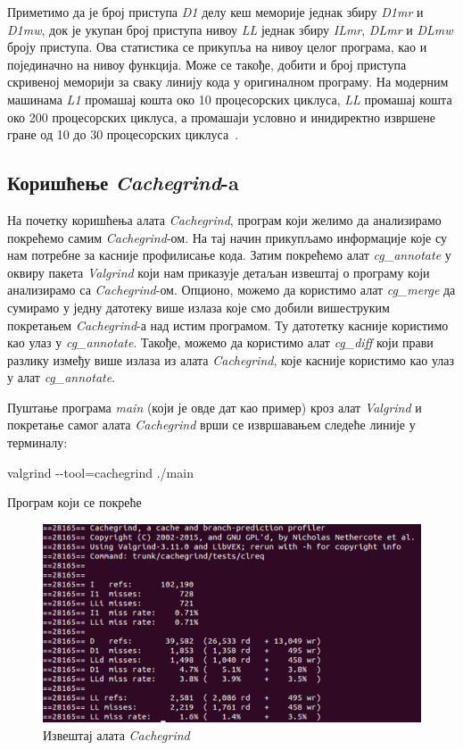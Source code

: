 \documentclass[12pt,oneside]{memoir}
\begin{document}
\indent Приметимо да је број приступа \textit{D1} делу кеш меморије једнак збиру \textit{D1mr} и \textit{D1mw}, док је укупан број приступа нивоу \textit{LL} једнак збиру  \textit{ILmr}, \textit{DLmr} и \textit{DLmw} броју приступа. Ова статистика се прикупља на нивоу целог програма, као и појединачно на нивоу функција. Може се такође, добити и број приступа скривеној меморији за сваку линију кода у оригиналном програму. На модерним машинама \textit{L1} промашај кошта око 10 процесорских циклуса, \textit{LL} промашај кошта око 200 процесорских циклуса, а промашаји условно и инидиректно извршене гране од 10 до 30 процесорских циклуса~\cite{cachegrindRef}.

\subsection{Коришћење \textit{Cachegrind}-a}

\indent На почетку коришћења алата \textit{Cachegrind}, програм који желимо да анализирамо покрећемо самим \textit{Cachegrind}-ом. На тај начин прикупљамо информације које су нам потребне за касније профилисање кода. Затим покрећемо алат \textit{cg\_annotate} у оквиру пакета \textit{Valgrind} који нам приказује детаљан извештај о програму који анализирамо са \textit{Cachegrind}-ом. Опционо, можемо да користимо алат \textit{cg\_merge} да сумирамо у једну датотеку више излаза које смо добили вишеструким покретањем \textit{Cachegrind}-а над истим програмом. Ту датотетку касније користимо као улаз у \textit{cg\_annotate}. Такође, можемо да користимо алат \textit{cg\_diff} који прави разлику између више излаза из алата \textit{Cachegrind}, које касније користимо као улаз у алат \textit{cg\_annotate}.

\indent Пуштање програма \textit{main} (који је овде дат	 као пример) кроз алат \textit{Valgrind} и покретање самог алата \textit{Cachegrind} врши се извршавањем следеће линије у терминалу:

\begin{center}
\large
 valgrind -\--tool=cachegrind ./main
\end{center}

Програм који се покреће

\begin{figure}[h!]
\begin{center}
\includegraphics[scale=0.75]{slika10.png}
\end{center}
\caption{Извештај алата \textit{Cachegrind}}
\label{fig:cachegrind}
\end{figure}
\end{document}
